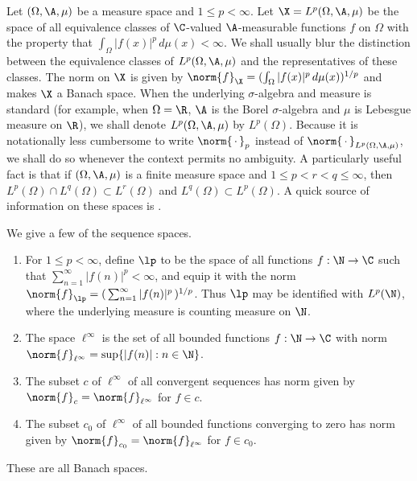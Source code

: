 \begin{example}\label{L^p example}
Let $(\Omega,\A,\mu)$ be a measure space and $1\leq p<\infty$. Let
$\X=L^p(\Omega,\A,\mu)$ be the space of all equivalence classes of
$\C$-valued $\A$-measurable functions $f$ on $\Omega$ with the property that
$\int_{\Omega}|f(x)|^p\,d\mu(x)<\infty$. We shall usually blur the distinction
between the equivalence classes of $L^p(\Omega,\A,\mu)$ and the representatives
of these classes. The norm on $\X$ is given by
$\norm{f}_{\X}=(\int_{\Omega}|f(x)|^p\,d\mu(x))^{1/p}$ and
makes $\X$ a Banach space. When the underlying $\sigma$-algebra and measure is
standard (for example, when $\Omega=\R$, $\A$ is the Borel $\sigma$-algebra
and $\mu$ is Lebesgue measure on $\R$), we shall denote
$L^p(\Omega,\A,\mu)$ by $L^p(\Omega)$.
Because it
is notationally less cumbersome to write $\norm{\,\cdot\,}_p$ instead of
$\norm{\,\cdot\,}_{L^p(\Omega,\A,\mu)}$, we shall do so whenever the context
permits no ambiguity. A particularly useful fact is that if $(\Omega,\A,\mu)$ is
a finite measure space and $1\leq p<r<q\leq\infty$, then
$L^p(\Omega)\cap L^q(\Omega)\subset L^r(\Omega)$ and
$L^q(\Omega)\subset L^p(\Omega)$. A quick source of information on these spaces
is \cite[\S 6.4]{Pedersen}.
\end{example}

\begin{example}
We give a few of the sequence spaces.
\begin{enumerate}
\item For $1\leq p<\infty$, define $\lp$ to be
the space of all functions $f:\N\rightarrow\C$ such that
$\sum_{n=1}^{\infty}|f(n)|^p<\infty$, and equip it with the norm
$\norm{f}_{\lp}=(\,\sum_{n=1}^{\infty}|f(n)|^p\,)^{1/p}$. Thus $\lp$ may be
identified with $L^p(\N)$, where the underlying measure is counting measure on
$\N$.
\item The space $\ell^{\infty}$ is the set of all bounded functions
$f:\N\rightarrow\C$ with norm $\norm{f}_{\ell^{\infty}}=\sup\{|f(n)|:n\in\N\}$.
\item The subset $c$ of $\ell^{\infty}$ of all convergent sequences
has norm given by $\norm{f}_c=\norm{f}_{\ell^{\infty}}$ for $f\in c$.
\item The subset $c_0$ of $\ell^{\infty}$ of all bounded functions converging to
zero has norm given by $\norm{f}_{c_0}=\norm{f}_{\ell^{\infty}}$ for $f\in c_0$.
\end{enumerate}These are all Banach spaces.
\end{example}

